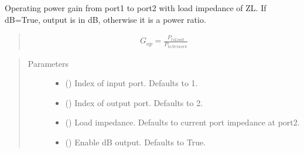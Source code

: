\documentclass[letterpaper,10pt,english]{sphinxmanual}
\begin{document}
\begin{fulllineitems}
\begin{fulllineitems}
\label{\detokenize{touchstone:touchstone.spfile.gop}}
Operating power gain from port1 to port2 with load impedance of ZL. If dB=True, output is in dB, otherwise it is a power ratio.
\begin{quote}
\begin{equation*}
\begin{split}G_{op}=\frac{P_{toLoad}}{P_{toNetwork}}\end{split}
\end{equation*}\end{quote}
\begin{quote}\begin{description}
\item[{Parameters}] \leavevmode\begin{itemize}
\item {} 
 (\sphinxstyleliteralemphasis{\sphinxupquote{, }}) \textendash{} Index of input port. Defaults to 1.

\item {} 
 (\sphinxstyleliteralemphasis{\sphinxupquote{, }}) \textendash{} Index of output port. Defaults to 2.

\item {} 
 (\sphinxstyleliteralemphasis{\sphinxupquote{, }}) \textendash{} Load impedance. Defaults to current port impedance at port2.

\item {} 
 (\sphinxstyleliteralemphasis{\sphinxupquote{, }}) \textendash{} Enable dB output. Defaults to True.


\end{itemize}
\end{description}
\end{quote}
\end{fulllineitems}
\end{fulllineitems}
\end{document}
